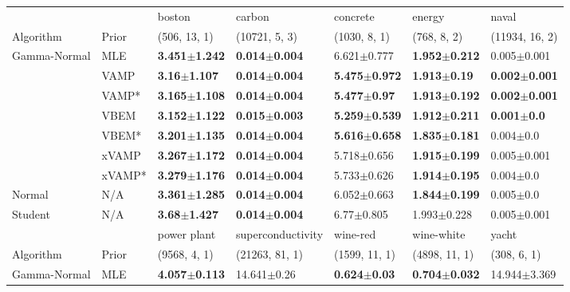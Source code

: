 \begin{tabular}{lllllll}
\toprule
        &     &                    boston &                    carbon &                  concrete &                    energy &                     naval \\
Algorithm & Prior& (506, 13, 1)& (10721, 5, 3)& (1030, 8, 1)& (768, 8, 2)& (11934, 16, 2)\\
\midrule
Gamma-Normal & MLE &  \textbf{3.451$\pm$1.242} &  \textbf{0.014$\pm$0.004} &           6.621$\pm$0.777 &  \textbf{1.952$\pm$0.212} &           0.005$\pm$0.001 \\
        & VAMP &   \textbf{3.16$\pm$1.107} &  \textbf{0.014$\pm$0.004} &  \textbf{5.475$\pm$0.972} &   \textbf{1.913$\pm$0.19} &  \textbf{0.002$\pm$0.001} \\
        & VAMP* &  \textbf{3.165$\pm$1.108} &  \textbf{0.014$\pm$0.004} &   \textbf{5.477$\pm$0.97} &  \textbf{1.913$\pm$0.192} &  \textbf{0.002$\pm$0.001} \\
        & VBEM &  \textbf{3.152$\pm$1.122} &  \textbf{0.015$\pm$0.003} &  \textbf{5.259$\pm$0.539} &  \textbf{1.912$\pm$0.211} &    \textbf{0.001$\pm$0.0} \\
        & VBEM* &  \textbf{3.201$\pm$1.135} &  \textbf{0.014$\pm$0.004} &  \textbf{5.616$\pm$0.658} &  \textbf{1.835$\pm$0.181} &             0.004$\pm$0.0 \\
        & xVAMP &  \textbf{3.267$\pm$1.172} &  \textbf{0.014$\pm$0.004} &           5.718$\pm$0.656 &  \textbf{1.915$\pm$0.199} &           0.005$\pm$0.001 \\
        & xVAMP* &  \textbf{3.279$\pm$1.176} &  \textbf{0.014$\pm$0.004} &           5.733$\pm$0.626 &  \textbf{1.914$\pm$0.195} &             0.004$\pm$0.0 \\
Normal & N/A &  \textbf{3.361$\pm$1.285} &  \textbf{0.014$\pm$0.004} &           6.052$\pm$0.663 &  \textbf{1.844$\pm$0.199} &             0.005$\pm$0.0 \\
Student & N/A &   \textbf{3.68$\pm$1.427} &  \textbf{0.014$\pm$0.004} &            6.77$\pm$0.805 &           1.993$\pm$0.228 &           0.005$\pm$0.001 \\
\midrule
        &     &               power plant &          superconductivity &                  wine-red &                wine-white &                     yacht \\
Algorithm & Prior& (9568, 4, 1)& (21263, 81, 1)& (1599, 11, 1)& (4898, 11, 1)& (308, 6, 1)\\
\midrule
Gamma-Normal & MLE &  \textbf{4.057$\pm$0.113} &            14.641$\pm$0.26 &   \textbf{0.624$\pm$0.03} &  \textbf{0.704$\pm$0.032} &          14.944$\pm$3.369 \\

\end{tabular}
